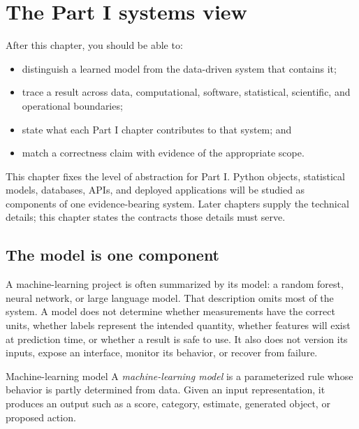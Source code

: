 \chapter{The Part I systems view}
\label{ch:part-i-overview}

\begin{learningobjectives}
After this chapter, you should be able to:
\begin{itemize}
  \item distinguish a learned model from the data-driven system that contains it;
  \item trace a result across data, computational, software, statistical,
  scientific, and operational boundaries;
  \item state what each Part I chapter contributes to that system; and
  \item match a correctness claim with evidence of the appropriate scope.
\end{itemize}
\end{learningobjectives}

\begin{chapterconnection}
This chapter fixes the level of abstraction for Part I. Python objects,
statistical models, databases, APIs, and deployed applications will be studied
as components of one evidence-bearing system. Later chapters supply the
technical details; this chapter states the contracts those details must serve.
\end{chapterconnection}

\section{The model is one component}

A machine-learning project is often summarized by its model: a random forest,
neural network, or large language model. That description omits most of the
system. A model does not determine whether measurements have the correct units,
whether labels represent the intended quantity, whether features will exist at
prediction time, or whether a result is safe to use. It also does not version
its inputs, expose an interface, monitor its behavior, or recover from failure.

\begin{definitionbox}{Machine-learning model}
A \emph{machine-learning model} is a parameterized rule whose behavior is
partly determined from data. Given an input representation, it produces an
output such as a score, category, estimate, generated object, or proposed
action.
\end{definitionbox}

